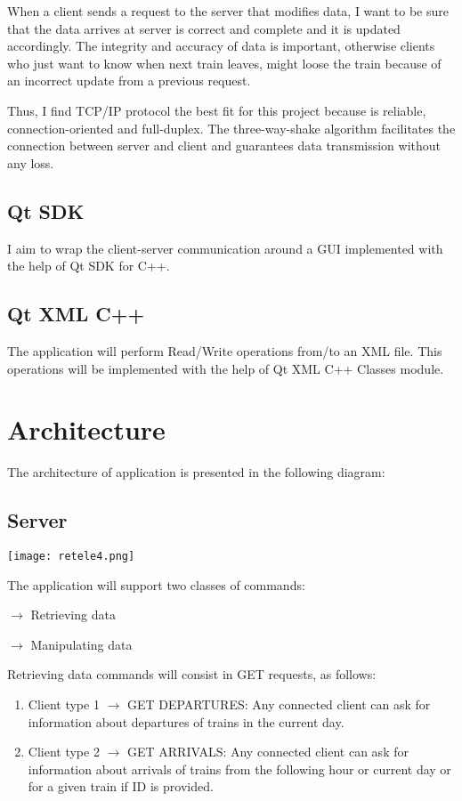 \documentclass[runningheads]{llncs}
\begin{document}
When a client sends a request to the server that modifies data, I want to be sure that the data arrives at server is correct and complete and it is updated accordingly. The integrity and accuracy of data is important, otherwise clients who just want to know when next train leaves, might loose the train because of an incorrect update from a previous request. 

Thus, I find TCP/IP protocol the best fit for this project \cite{ref_url1} because is reliable, connection-oriented and full-duplex. The three-way-shake algorithm facilitates the connection between server and client and guarantees data transmission without any loss.

\subsection{Qt SDK}
I aim to wrap the client-server communication around a GUI implemented with the help of Qt SDK for C++.

\subsection{Qt XML C++}
The application will perform Read/Write operations from/to an XML file. This operations will be implemented with the help of Qt XML C++ Classes module. \cite{ref_url3}

\section{Architecture}

The architecture of application is presented in the following diagram:

\subsection{Server}
\hspace*{-1.2in}
\texttt{[image: retele4.png]}


The application will support two classes of commands:

$\rightarrow$ Retrieving data

$\rightarrow$ Manipulating data

Retrieving data commands will consist in GET requests, as follows:

\begin{enumerate}
    \item Client type 1 $\rightarrow$ GET DEPARTURES: Any connected client can ask for information about departures of trains in the current day.
    \item Client type 2 $\rightarrow$ GET ARRIVALS: Any connected client can ask for information about arrivals of trains from the following hour or current day or for a given train if ID is provided.
\end{enumerate}
\end{document}
